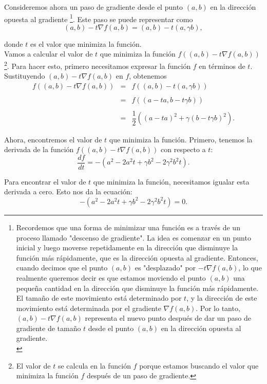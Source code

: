 \begin{enumerate}
\begin{enumerate}[\bfseries (a)]
	    Consideremos ahora un paso de gradiente desde el punto $(a,b)$ en la dirección opuesta al gradiente 
	    \footnote{
		Recordemos que una forma de minimizar una función es a través de un proceso llamado "descenso de gradiente". La idea es comenzar en un punto inicial y luego moverse repetidamente en la dirección que disminuye la función más rápidamente, que es la dirección opuesta al gradiente. Entonces, cuando decimos que el punto $(a,b)$ es "desplazado" por $-t\nabla f(a,b)$, lo que realmente queremos decir es que estamos moviendo el punto $(a,b)$ una pequeña cantidad en la dirección que disminuye la función más rápidamente. El tamaño de este movimiento está determinado por $t$, y la dirección de este movimiento está determinada por el gradiente $\nabla f(a,b)$.
		Por lo tanto, $(a,b)-t\nabla f(a,b)$ representa el nuevo punto después de dar un paso de gradiente de tamaño $t$ desde el punto $(a,b)$ en la dirección opuesta al gradiente.\\}. 
	    Este paso se puede representar como 
	    $$(a,b)-t\nabla f(a,b)=(a,b)-t(a,\gamma b),$$ 

	    donde $t$ es el valor que minimiza la función.\\

	    Vamos a calcular el valor de $t$ que minimiza la función $f\left((a,b)-t\nabla f(a,b)\right)$ 
	    \footnote{ El valor de $t$ se calcula en la función $f$ porque estamos buscando el valor que minimiza la función $f$ después de un paso de gradiente.}. 
	    Para hacer esto, primero necesitamos expresar la función $f$ en términos de $t$. Sustituyendo $(a,b)-t\nabla f(a,b)$ en $f$, obtenemos
	    $$
	    \begin{array}{rcl}
	    f\left((a,b)-t\nabla f(a,b)\right) &=& f\left((a,b)-t(a,\gamma b)\right)\\\\
					       &=& f\left((a-ta, b-t\gamma b)\right)\\\\
					       &=& \dfrac{1}{2}\left((a-ta)^2 + \gamma (b-t\gamma b)^2\right).
	    \end{array}
	    $$

	    Ahora, encontremos el valor de $t$ que minimiza la función.  Primero, tenemos la derivada de la función $f\left((a,b)-t\nabla f(a,b)\right)$ con respecto a $t$:
	    $$\frac{df}{dt} = -(a^2 - 2a^2t + \gamma b^2 - 2\gamma^2 b^2t).$$

	    Para encontrar el valor de $t$ que minimiza la función, necesitamos igualar esta derivada a cero. Esto nos da la ecuación:
	    $$-(a^2 - 2a^2t + \gamma b^2 - 2\gamma^2 b^2t) = 0.$$


\end{enumerate}
\end{enumerate}

